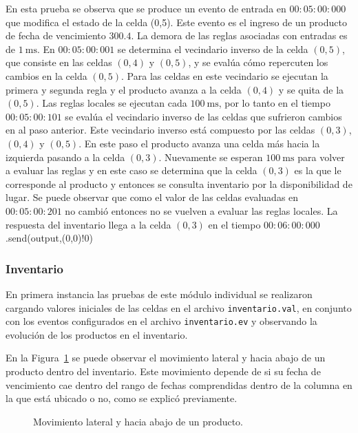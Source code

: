 \documentclass[10pt]{article}
\begin{document}
En esta prueba se observa que se produce un evento de entrada en $00:05:00:000$ que modifica el estado de la celda (0,5). Este evento es el ingreso de un producto de fecha de vencimiento $300.4$. La demora de las reglas asociadas con entradas es de $1~\textrm{ms}$. En $00:05:00:001$ se determina el vecindario inverso de la celda $(0,5)$, que consiste en las celdas $(0,4)$ y $(0,5)$, y se evalúa cómo repercuten los cambios en la celda $(0,5)$. Para las celdas en este vecindario se ejecutan la primera y segunda regla y el producto avanza a la celda $(0,4)$ y se quita de la $(0,5)$. Las reglas locales se ejecutan cada $100~\textrm{ms}$, por lo tanto en el tiempo $00:05:00:101$ se evalúa el vecindario inverso de las celdas que sufrieron cambios en al paso anterior. Este vecindario inverso está compuesto por las celdas $(0,3)$, $(0,4)$ y $(0,5)$. En este paso el producto avanza una celda más hacia la izquierda pasando a la celda $(0,3)$. Nuevamente se esperan $100~\textrm{ms}$ para volver a evaluar las reglas y en este caso se determina que la celda $(0,3)$ es la que le corresponde al producto y entonces se consulta inventario por la disponibilidad de lugar. Se puede observar que como el valor de las celdas evaluadas en $00:05:00:201$ no cambió entonces no se vuelven a evaluar las reglas locales. La respuesta del inventario llega a la celda $(0,3)$ en el tiempo $00:06:00:000$.send(output,(0,0)!0)




\subsubsection{Inventario}
En primera instancia las pruebas de este módulo individual se realizaron cargando valores iniciales de las celdas en el archivo \verb|inventario.val|, en conjunto con los eventos configurados en el archivo \verb|inventario.ev| y observando la evolución de los productos en el inventario.

En la Figura~\ref{fig:IP-movimiento} se puede observar el movimiento lateral y hacia abajo de un producto dentro del inventario. Este movimiento depende de si su fecha de vencimiento cae dentro del rango de fechas comprendidas dentro de la columna en la que está ubicado o no, como se explicó previamente.

\begin{figure}[h] 
	\centering
	\hfill
	\hfill
	\caption{Movimiento lateral y hacia abajo de un producto.} 
	\label{fig:IP-movimiento} 
\end{figure}
\FloatBarrier
\end{document}
